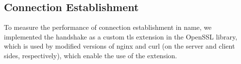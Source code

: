 
\subsection{Connection Establishment}
\label{sec:evaluation:performance}


To measure the performance of connection establishment in \ac{name},
we implemented the handshake as a custom \ac{tls} extension in the
OpenSSL library, which is used by modified versions of nginx and curl
(on the server and client sides, respectively), which enable the use
of the extension.


